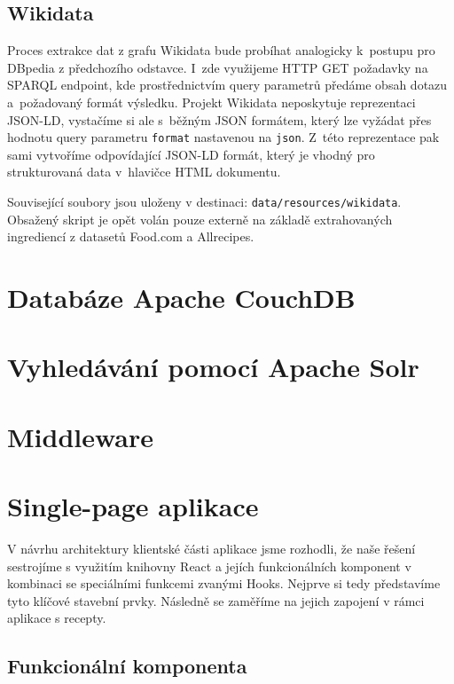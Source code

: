 \subsection{Wikidata}

Proces extrakce dat z grafu Wikidata bude probíhat analogicky k~postupu pro DBpedia z předchozího odstavce. I~zde využijeme HTTP GET požadavky na SPARQL endpoint, kde prostřednictvím query parametrů předáme obsah dotazu a~požadovaný formát výsledku. Projekt Wikidata neposkytuje reprezentaci JSON-LD, vystačíme si ale s~běžným JSON formátem, který lze vyžádat přes hodnotu query parametru \texttt{format} nastavenou na \texttt{json}. Z~této reprezentace pak sami vytvoříme odpovídající JSON-LD formát, který je vhodný pro strukturovaná data v~hlavičce HTML dokumentu.

Související soubory jsou uloženy v destinaci: \texttt{data/resources/wikidata}. Obsažený skript je opět volán pouze externě na základě extrahovaných ingrediencí z datasetů Food.com a Allrecipes. 

\section{Databáze Apache CouchDB}


\section{Vyhledávání pomocí Apache Solr}


\section{Middleware}


\section{Single-page aplikace}

V návrhu architektury klientské části aplikace jsme rozhodli, že naše řešení sestrojíme s využitím knihovny React a jejích funkcionálních komponent v kombinaci se speciálními funkcemi zvanými Hooks. Nejprve si tedy představíme tyto klíčové stavební prvky. Následně se zaměříme na jejich zapojení v rámci aplikace s recepty.

\subsection{Funkcionální komponenta}

